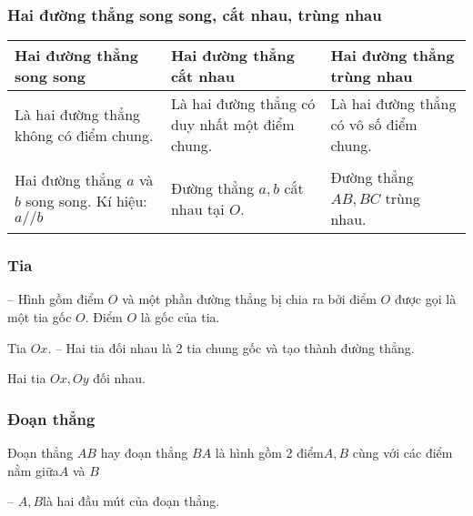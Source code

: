 \subsubsection{Hai đường thẳng song song, cắt nhau, trùng nhau}
\begin{center}
	\begin{tabularx}{\textwidth}{|*{3}{Y|} }
		\hline
		Hai đường thẳng song song&	Hai đường thẳng cắt nhau&	Hai đường thẳng trùng nhau\\
		\hline
		Là hai đường thẳng không có điểm chung.& Là hai đường thẳng có duy nhất một điểm chung. & Là hai đường thẳng có vô số điểm chung.\\
		\begin{tikzpicture}
			
		\end{tikzpicture} & \begin{tikzpicture}
		
		\end{tikzpicture}& \begin{tikzpicture}
		
		\end{tikzpicture}\\
		Hai đường thẳng $a$ và $b$ song song.
		Kí hiệu: $a//b$ & Đường thẳng $a,b$ cắt nhau tại $O$. & Đường thẳng $AB,BC$ trùng nhau.
	\end{tabularx}
\end{center}
\subsubsection{Tia}
-- Hình gồm điểm $O$ và một phần đường thẳng bị chia ra bởi điểm $O$ được gọi là một tia gốc $O$. 
Điểm $O$ là gốc của tia.
\begin{center}
	\begin{tikzpicture}
		
	\end{tikzpicture}
\end{center}
Tia $Ox$.
-- Hai tia đối nhau là 2 tia chung gốc và tạo thành đường thẳng.
\begin{center}
	\begin{tikzpicture}
		
	\end{tikzpicture}
\end{center}
Hai tia $Ox,Oy$ đối nhau.
\subsubsection{Đoạn thẳng}
Đoạn thẳng $AB$ hay đoạn thẳng $BA$ là hình gồm 2 điểm$ A,B$ cùng với các điểm nằm giữa$ A$ và $B$
\begin{center}
	\begin{tikzpicture}
		
	\end{tikzpicture}
\end{center}
-- $A,B$là hai đầu mút của đoạn thẳng.
